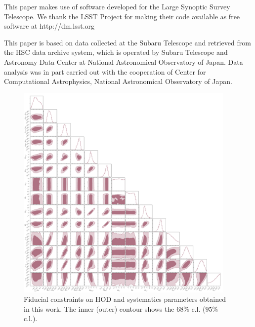 \documentclass[a4paper,11pt]{article}
\begin{document}
This paper makes use of software developed for the Large Synoptic Survey Telescope. We thank the LSST Project for making their code available as free software at  http://dm.lsst.org

This paper is based on data collected at the Subaru Telescope and retrieved from the HSC data archive system, which is operated by Subaru Telescope and Astronomy Data Center at National Astronomical Observatory of Japan. Data analysis was in part carried out with the cooperation of Center for Computational Astrophysics, National Astronomical Observatory of Japan.

\appendix

\begin{figure}
\begin{center}
\includegraphics[width=0.95\textwidth]{figures/contours_mPk=HOD_fix=alpha-fc-sigmaM_HOD=zevol_fit=pz-shifts+prior=0p2-pz-widths+prior=0p2_fit=auto+cross_cosmo=const_cov=G+NG+SSC-LINBIAS_HOD-param=zfid_clfit=HOD-zevol.pdf}
\caption{Fiducial constraints on HOD and systematics parameters obtained in this work. The inner (outer) contour shows the $68 \%$ c.l. ($95 \%$ c.l.).}
\label{fig:constraints-fid-full}
\end{center}
\end{figure}
\end{document}
